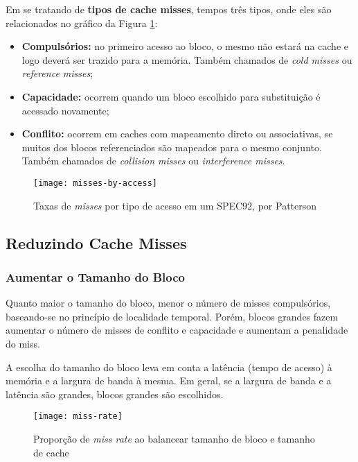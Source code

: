 Em se tratando de \textbf{tipos de cache misses}, tempos três tipos, onde eles são relacionados no gráfico da Figura \ref{fig:misses-by-access}:

\begin{itemize}
  \item \textbf{Compulsórios:} no primeiro acesso ao bloco, o mesmo não estará na cache e logo deverá ser trazido para a memória. Também chamados de \textit{cold misses} ou \textit{reference misses};

  \item \textbf{Capacidade:} ocorrem quando um bloco escolhido para substituição é acessado novamente;

  \item \textbf{Conflito:} ocorrem em caches com mapeamento direto ou associativas, se muitos dos blocos referenciados são mapeados para o mesmo conjunto. Também chamados de \textit{collision misses} ou \textit{interference misses}.
\end{itemize}

\begin{figure}[ht]
  \centering
  \texttt{[image: misses-by-access]}
  \caption{Taxas de \textit{misses} por tipo de acesso em um SPEC92, por Patterson}
  \label{fig:misses-by-access}
\end{figure}

\subsection{Reduzindo Cache Misses}

\subsubsection{Aumentar o Tamanho do Bloco}
Quanto maior o tamanho do bloco, menor o número de misses compulsórios, baseando-se no princípio de localidade temporal. Porém, blocos grandes fazem aumentar o número de misses de conflito e capacidade e aumentam a penalidade do miss.

A escolha do tamanho do bloco leva em conta a latência (tempo de acesso) à memória e a largura de banda à mesma. Em geral, se a largura de banda e a latência são grandes, blocos grandes são escolhidos.

\begin{figure}[ht]
  \centering
  \texttt{[image: miss-rate]}
  \label{fig:miss-rate}
  \caption{Proporção de \textit{miss rate} ao balancear tamanho de bloco e tamanho de cache}
\end{figure}


